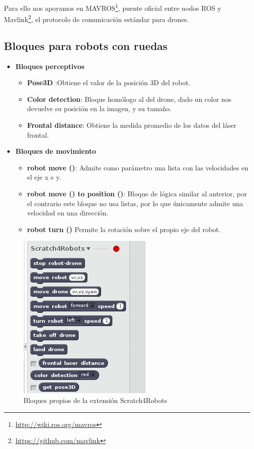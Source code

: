 Para ello nos apoyamos en MAVROS\footnote{\url{http://wiki.ros.org/mavros}}, puente oficial entre nodos ROS y Mavlink\footnote{\url{https://github.com/mavlink}}, el protocolo de comunicación estándar para drones.

\subsection{Bloques para robots con ruedas}
\begin{itemize}
\item \textbf{Bloques perceptivos}
	\begin{itemize}
	\item \textbf{Pose3D} :Obtiene el valor de la posición 3D del robot.
	\item \textbf{Color detection}: Bloque homólogo al del drone, dado un color nos devuelve su posición en la imagen, y su tamaño.
	\item \textbf{Frontal distance}: Obtiene la medida promedio de los datos del láser frontal. 
	\end{itemize}
\item \textbf{Bloques de movimiento}
	\begin{itemize}

	\item \textbf{robot move ()}: Admite como parámetro una lista con las velocidades en el eje x e y.
	\item \textbf{robot move () to position ()}: Bloque de lógica similar al anterior, por el contrario este bloque no usa listas, por lo que únicamente admite una velocidad en una dirección.
	\item \textbf{robot turn ()} Permite la rotación sobre el propio eje del robot.

	\end{itemize}
\end{itemize}

\begin{figure}[H]
    \centering
    \includegraphics[scale=0.75]{img/bloques-s4r.png}
  	\caption{Bloques propios de la extensión Scratch4Robots}
  	\label{fig:curiosity}
\end{figure}


